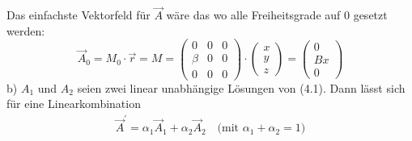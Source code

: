 \documentclass[11pt a4paper]{article}
\begin{document}
Das einfachste Vektorfeld für $\vec A$ wäre das wo alle Freiheitsgrade auf 
0 gesetzt werden:
\[
	\vec A_0 = M_0 \cdot \vec r = 
	M = \begin{pmatrix}
		0 &0 &0 \\ \beta &0 &0 \\ 0 &0 &0
	\end{pmatrix}
	\cdot \begin{pmatrix}
		x \\ y \\ z
	\end{pmatrix}
	= 
	\begin{pmatrix}
		0 \\ Bx \\0
	\end{pmatrix}
\]
\vspace{0.5cm}
b) $A_1$ und $A_2$ seien zwei linear unabhängige Lösungen von (4.1). Dann 
lässt sich für eine Linearkombination 
\begin{align*}
	\vec A^\prime = \alpha_1 \vec A_1 + \alpha_2 \vec A_2
	\quad \text{(mit $\alpha_1 + \alpha_2 = 1$)}
\end{align*}
\end{document}
